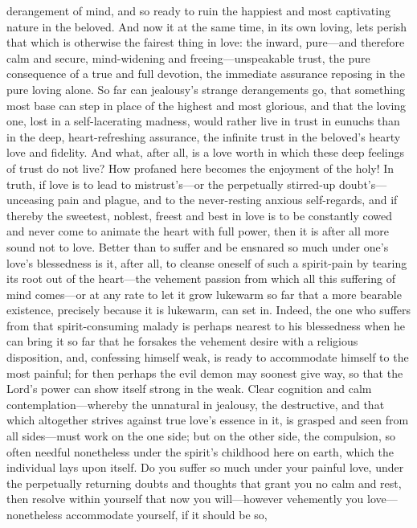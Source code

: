 \documentclass[12pt,a4paper]{book}
\begin{document}
derangement of mind, and so ready to ruin the happiest and most captivating
nature in the beloved. And now it at the same time, in its own loving, lets
perish that which is otherwise the fairest thing in love: the inward,
pure---and therefore calm and secure, mind-widening and freeing---unspeakable
trust, the pure consequence of a true and full devotion, the immediate
assurance reposing in the pure loving alone. So far can jealousy's strange
derangements go, that something most base can step in place of the highest
and most glorious, and that the loving one, lost in a self-lacerating
madness, would rather live in trust in eunuchs than in the deep,
heart-refreshing assurance, the infinite trust in the beloved's hearty love
and fidelity. And what, after all, is a love worth in which these deep
feelings of trust do not live? How profaned here becomes the enjoyment of
the holy! In truth, if love is to lead to mistrust's---or the perpetually
stirred-up doubt's---unceasing pain and plague, and to the never-resting
anxious self-regards, and if thereby the sweetest, noblest, freest and best
in love is to be constantly cowed and never come to animate the heart with
full power, then it is after all more sound not to love. Better than to
suffer and be ensnared so much under one's love's blessedness is it, after
all, to cleanse oneself of such a spirit-pain by tearing its root out of
the heart---the vehement passion from which all this suffering of mind
comes---or at any rate to let it grow lukewarm so far that a more bearable
existence, precisely because it is lukewarm, can set in. Indeed, the one
who suffers from that spirit-consuming malady is perhaps nearest to his
blessedness when he can bring it so far that he forsakes the vehement
desire with a religious disposition, and, confessing himself weak, is ready
to accommodate himself to the most painful; for then perhaps the evil demon
may soonest give way, so that the Lord's power can show itself strong in
the weak. Clear cognition and calm contemplation---whereby the unnatural in
jealousy, the destructive, and that which altogether strives against true
love's essence in it, is grasped and seen from all sides---must work on the
one side; but on the other side, the compulsion, so often needful
nonetheless under the spirit's childhood here on earth, which the
individual lays upon itself. Do you suffer so much under your painful love,
under the perpetually returning doubts and thoughts that grant you no calm
and rest, then resolve within yourself that now you will---however
vehemently you love---nonetheless accommodate yourself, if it should be so,
\end{document}
